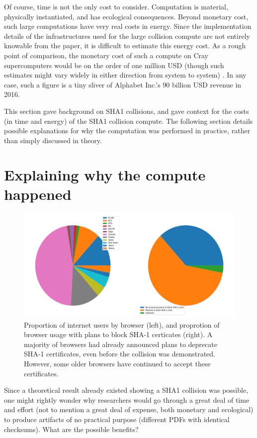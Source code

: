 \documentclass[sigconf]{acmart}
\begin{document}
Of course, time is not the only cost to consider.
Computation is material, physically instantiated, and has ecological consequences.
Beyond monetary cost, such large computations have very real costs in energy.
Since the implementation details of the infrastructures used for the large collision compute are not entirely knowable from the paper,
it is difficult to estimate this energy cost.
As a rough point of comparison, the monetary cost of such a compute on Cray supercomputers would be on the order of one million USD 
(though such estimates might vary widely in either direction from system to system)
\cite{Pautsch2016}.
In any case, such a figure is a tiny sliver of Alphabet Inc.'s 90 billion USD revenue in 2016.

This section gave background on SHA1 collisions, 
and gave context for the costs (in time and energy) of the SHA1 collision compute.
The following section details possible explanations for why the computation was performed
in practice, rather than simply discussed in theory.


\section{Explaining why the compute happened}
\label{sec:orgdcfabee}

\begin{figure}
\centering
\includegraphics[width=.9\linewidth]{./figures/browser-share.png}
\caption{Proportion of internet users by browser (left), and proprotion of browser usage with plans to block SHA-1 certicates (right). A majority of browsers had already announced plans to deprecate SHA-1 certificates, even before the collision was demonstrated. However, some older browsers have continued to accept these certificates.}
\end{figure}

Since a theoretical result already existed showing a SHA1 collision was possible, 
one might rightly wonder why researchers would go through a great deal of time and effort
(not to mention a great deal of expense, both monetary and ecological)
to produce artifacts of no practical purpose (different PDFs with identical checksums).
What are the possible benefits?
\end{document}
